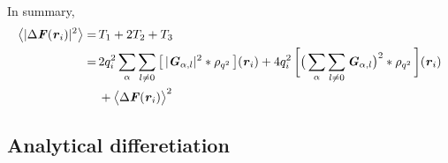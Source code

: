 \documentclass[aps,pre,preprint]{revtex4}
\renewcommand{\v}[1]{\textbf{\textit{#1}}}
\begin{document}
In summary,
\begin{align}\nonumber
  \big\langle
  \vert \Delta\v F(\v r_i)\vert^2
  \big\rangle
  =&\,
  T_1 + 2T_2 + T_3\\\nonumber
  =&\, 
  2q_i^2
  \sum_{\alpha} \sum_{l\neq 0}
  \big[\,
  \vert \v G_{\alpha,l}\vert^2
  \ast \rho_{q^2}
  \,\big] (\v r_i)
  +
  4q_i^2\,
  \bigg[
  \big(
  \sum_{\alpha} \sum_{l\neq 0}  
  \v G_{\alpha,l}
  \big)^2
  \ast \rho_{q^2}\,
  \bigg] (\v r_i) \\
  &\,+
  \big\langle
  \Delta\v F(\v r_i)
  \big\rangle  ^2
\end{align}


\subsection{Analytical differetiation}
\end{document}
